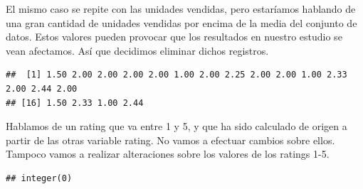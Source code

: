 \documentclass[
]{article}
\newenvironment{Shaded}{\begin{snugshade}}{\end{snugshade}}
\newcommand{\DecValTok}[1]{\textcolor[rgb]{0.00,0.00,0.81}{#1}}
\newcommand{\KeywordTok}[1]{\textcolor[rgb]{0.13,0.29,0.53}{\textbf{#1}}}
\newcommand{\NormalTok}[1]{#1}
\newcommand{\OperatorTok}[1]{\textcolor[rgb]{0.81,0.36,0.00}{\textbf{#1}}}
\newcommand{\StringTok}[1]{\textcolor[rgb]{0.31,0.60,0.02}{#1}}
\begin{document}
El mismo caso se repite con las unidades vendidas, pero estaríamos
hablando de una gran cantidad de unidades vendidas por encima de la
media del conjunto de datos. Estos valores pueden provocar que los
resultados en nuestro estudio se vean afectamos. Así que decidimos
eliminar dichos registros.

\begin{Shaded}
\end{Shaded}

\begin{Shaded}
\end{Shaded}

\begin{verbatim}
##  [1] 1.50 2.00 2.00 2.00 2.00 1.00 2.00 2.25 2.00 2.00 1.00 2.33 2.00 2.44 2.00
## [16] 1.50 2.33 1.00 2.44
\end{verbatim}

Hablamos de un rating que va entre 1 y 5, y que ha sido calculado de
origen a partir de las otras variable rating. No vamos a efectuar
cambios sobre ellos. Tampoco vamos a realizar alteraciones sobre los
valores de los ratings 1-5.

\begin{Shaded}
\end{Shaded}

\begin{verbatim}
## integer(0)
\end{verbatim}

\begin{Shaded}
\end{Shaded}
\end{document}
